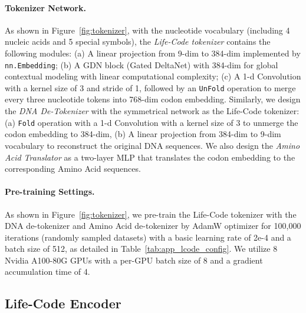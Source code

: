 
\vspace{-0.5em}
\paragraph{Tokenizer Network.}
As shown in Figure~\ref{fig:tokenizer}, with the nucleotide vocabulary (including 4 nucleic acids and 5 special symbols), the \textit{Life-Code tokenizer} contains the following modules: (a) A linear projection from 9-dim to 384-dim implemented by \texttt{nn.Embedding}; (b) A GDN block (Gated DeltaNet) with 384-dim for global contextual modeling with linear computational complexity; (c) A 1-d Convolution with a kernel size of 3 and stride of 1, followed by an \texttt{UnFold} operation to merge every three nucleotide tokens into 768-dim codon embedding. Similarly, we design the \textit{DNA De-Tokenizer} with the symmetrical network as the Life-Code tokenizer: (a) \texttt{Fold} operation with a 1-d Convolution with a kernel size of 3 to unmerge the codon embedding to 384-dim, (b) A linear projection from 384-dim to 9-dim vocabulary to reconstruct the original DNA sequences. We also design the \textit{Amino Acid Translator} as a two-layer MLP that translates the codon embedding to the corresponding Amino Acid sequences.

\vspace{-0.5em}
\paragraph{Pre-training Settings.}
As shown in Figure~\ref{fig:tokenizer}, we pre-train the Life-Code tokenizer with the DNA de-tokenizer and Amino Acid de-tokenizer by AdamW optimizer for 100,000 iterations (randomly sampled datasets) with a basic learning rate of 2e-4 and a batch size of 512, as detailed in Table~\ref{tab:app_lcode_config}. We utilize 8 Nvidia A100-80G GPUs with a per-GPU batch size of 8 and a gradient accumulation time of 4.


\subsection{Life-Code Encoder}
\label{app:impl_encoder}
